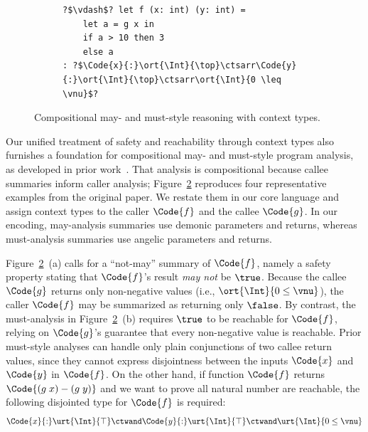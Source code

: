 \begin{figure}[h!]
\begin{subfigure}[t]{0.48\linewidth}
\begin{verbatim}
?$\vdash$? let f (x: int) (y: int) =
    let a = g x in
    if a > 10 then 3
    else a
: ?$\Code{x}{:}\ort{\Int}{\top}\ctsarr\Code{y}{:}\ort{\Int}{\top}\ctsarr\ort{\Int}{0 \leq \vnu}$?
\end{verbatim}
        \label{fig:may-must-inter}
    \end{subfigure}
    \caption{Compositional may- and must-style reasoning with context types.}
    \label{fig:may-must-analysis}
\end{figure}

Our unified treatment of safety and reachability through context types also furnishes a foundation for compositional may- and must-style program analysis, as developed in prior work~\cite{MayMust}. That analysis is compositional because callee summaries inform caller analysis; Figure~\ref{fig:may-must-analysis} reproduces four representative examples from the original paper. We restate them in our core language and assign context types to the caller $\Code{f}$ and the callee $\Code{g}$. In our encoding, may-analysis summaries use demonic parameters and returns, whereas must-analysis summaries use angelic parameters and returns.

Figure~\ref{fig:may-must-analysis}~(a) calls for a ``not-may'' summary of $\Code{f}$, namely a safety property stating that $\Code{f}$'s result \emph{may not} be $\true$. Because the callee $\Code{g}$ returns only non-negative values (i.e., $\ort{\Int}{0 \leq \vnu}$), the caller $\Code{f}$ may be summarized as returning only $\false$. By contrast, the must-analysis in Figure~\ref{fig:may-must-analysis}~(b) requires $\true$ to be reachable for $\Code{f}$, relying on $\Code{g}$'s guarantee that every non-negative value is reachable. Prior must-style analyses can handle only plain conjunctions of two callee return values, since they cannot express disjointness between the inputs $\Code{x}$ and $\Code{y}$ in $\Code{f}$. On the other hand, if function $\Code{f}$ returns $\Code{(g\;x) - (g\;y)}$ and we want to prove all natural number are reachable, the following disjointed type for $\Code{f}$ is required:
\begin{align*}
  \Code{x}{:}\urt{\Int}{\top}\ctwand\Code{y}{:}\urt{\Int}{\top}\ctwand\urt{\Int}{0 \leq \vnu }
\end{align*}\noindent

